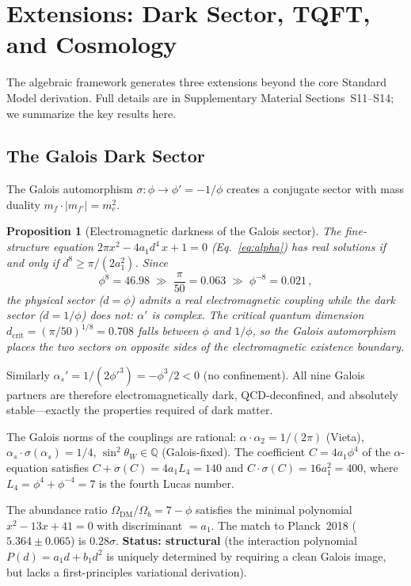 \documentclass[12pt,a4paper]{article}
\newtheorem{proposition}{Proposition}
\theoremstyle{definition}
\begin{document}
\section{Extensions: Dark Sector, TQFT, and Cosmology}
\label{sec:extensions}

The algebraic framework generates three extensions beyond the core Standard Model derivation.  Full details are in Supplementary Material Sections~S11--S14; we summarize the key results here.

\subsection{The Galois Dark Sector}
\label{sec:dark}

The Galois automorphism $\sigma: \phi \to \phi' = -1/\phi$ creates a conjugate sector with mass duality $m_f \cdot |m_{f'}| = m_e^2$.

\begin{proposition}[Electromagnetic darkness of the Galois sector]
\label{prop:dark_alpha}
The fine-structure equation $2\pi x^2 - 4a_1 d^4\, x + 1 = 0$ (Eq.~\ref{eq:alpha}) has real solutions if and only if $d^8 \geq \pi/(2a_1^2)$.  Since
\[
\phi^8 = 46.98 \;\gg\; \frac{\pi}{50} = 0.063 \;\gg\; \phi^{-8} = 0.021\,,
\]
the physical sector ($d = \phi$) admits a real electromagnetic coupling while the dark sector ($d = 1/\phi$) does not: $\alpha'$ is complex.  The critical quantum dimension $d_{\mathrm{crit}} = (\pi/50)^{1/8} = 0.708$ falls between $\phi$ and $1/\phi$, so the Galois automorphism places the two sectors on opposite sides of the electromagnetic existence boundary.
\end{proposition}

Similarly $\alpha_s' = 1/(2\phi'^3) = -\phi^3/2 < 0$ (no confinement).  All nine Galois partners are therefore electromagnetically dark, QCD-deconfined, and absolutely stable---exactly the properties required of dark matter.

The Galois norms of the couplings are rational: $\alpha \cdot \alpha_2 = 1/(2\pi)$ (Vieta), $\alpha_s \cdot \sigma(\alpha_s) = 1/4$, $\sin^2\theta_W \in \mathbb{Q}$ (Galois-fixed).  The coefficient $C = 4a_1\phi^4$ of the $\alpha$-equation satisfies $C + \sigma(C) = 4a_1 L_4 = 140$ and $C \cdot \sigma(C) = 16a_1^2 = 400$, where $L_4 = \phi^4 + \phi^{-4} = 7$ is the fourth Lucas number.

The abundance ratio $\Omega_{\text{DM}}/\Omega_b = 7 - \phi$ satisfies the minimal polynomial $x^2 - 13x + 41 = 0$ with discriminant $= a_1$.  The match to Planck~2018 ($5.364 \pm 0.065$) is $0.28\sigma$.  \textbf{Status: structural} (the interaction polynomial $P(d) = a_1 d + b_1 d^2$ is uniquely determined by requiring a clean Galois image, but lacks a first-principles variational derivation).
\end{document}

